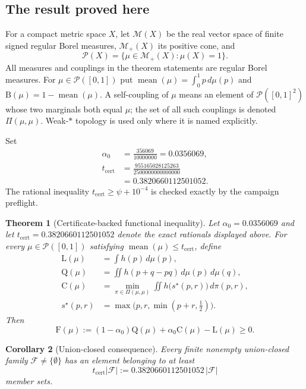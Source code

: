 \documentclass[11pt]{article}
\theoremstyle{plain}
\newtheorem{theorem}{Theorem}[section]
\newtheorem{corollary}[theorem]{Corollary}
\theoremstyle{definition}
\theoremstyle{remark}
\DeclareMathOperator{\mean}{mean}
\newcommand{\PP}{\mathcal P}
\newcommand{\sstar}{s^{\star}}
\newcommand{\Lb}{\mathrm{L}}
\newcommand{\Bb}{\mathrm{B}}
\newcommand{\Cc}{\mathrm{C}}
\newcommand{\Qq}{\mathrm{Q}}
\newcommand{\Ff}{\mathrm{F}}
\newcommand{\MM}{\mathcal M}
\begin{document}
\subsection{The result proved here}
For a compact metric space $X$, let $\MM(X)$ be the real vector space of finite
signed regular Borel measures, $\MM_+(X)$ its positive cone, and
\[
\PP(X)=\{\mu\in\MM_+(X):\mu(X)=1\}.
\]
All measures and couplings in the theorem statements are regular Borel
measures.  For $\mu\in\PP([0,1])$ put
$\mean(\mu)=\int_0^1p\,d\mu(p)$ and
$\Bb(\mu)=1-\mean(\mu)$.  A self-coupling of $\mu$ means an element of
$\PP([0,1]^2)$ whose two marginals both equal $\mu$; the set of all such
couplings is denoted $\Pi(\mu,\mu)$.  Weak-$*$ topology is used only where it
is named explicitly.

Set
\[
\begin{aligned}
\alpha_0&=\frac{356069}{10000000}=0.0356069,\\
t_{\mathrm{cert}}
&=\frac{955165028125263}{2500000000000000}\\
&=0.3820660112501052.
\end{aligned}
\]
The rational inequality
$t_{\mathrm{cert}}\ge\psi+10^{-4}$ is checked exactly by the campaign
preflight.

\begin{theorem}[Certificate-backed functional inequality]
\label{thm:main}
Let $\alpha_0=0.0356069$ and let
$t_{\mathrm{cert}}=0.3820660112501052$ denote the exact rationals displayed
above.  For every $\mu\in\PP([0,1])$ satisfying
$\mean(\mu)\le t_{\mathrm{cert}}$, define
\begin{align*}
\Lb(\mu)&=\int h(p)\,d\mu(p),\\
\Qq(\mu)&=\iint h(p+q-pq)\,d\mu(p)\,d\mu(q),\\
\Cc(\mu)&=\min_{\pi\in\Pi(\mu,\mu)}
  \iint h\bigl(\sstar(p,r)\bigr)\,d\pi(p,r),\\
\sstar(p,r)&=\max\bigl(p,r,\min(p+r,\tfrac12)\bigr).
\end{align*}
Then
\begin{equation}
\Ff(\mu):=(1-\alpha_0)\Qq(\mu)+\alpha_0\Cc(\mu)-\Lb(\mu)\ge0.
\label{eq:Fdef}
\end{equation}
\end{theorem}

\begin{corollary}[Union-closed consequence]
\label{cor:uc}
Every finite nonempty union-closed family $\mathcal F\ne\{\emptyset\}$ has an element
belonging to at least
\[
t_{\mathrm{cert}}|\mathcal F|
:=0.3820660112501052\,|\mathcal F|
\]
member sets.
\end{corollary}
\end{document}
